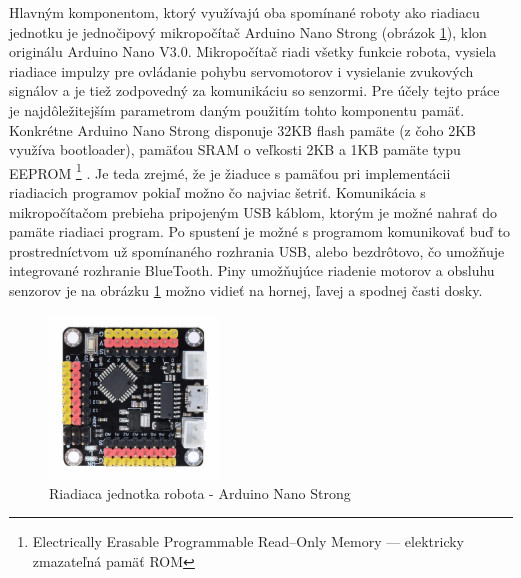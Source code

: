 Hlavným komponentom, ktorý využívajú oba spomínané roboty ako riadiacu jednotku je jednočipový mikropočítač Arduino Nano Strong (obrázok \ref{obr:arduino}), klon originálu Arduino Nano V3.0. Mikropočítač riadi všetky funkcie robota, vysiela riadiace impulzy pre ovládanie pohybu servomotorov i vysielanie zvukových signálov a je tiež zodpovedný za komunikáciu so senzormi. Pre účely tejto práce je najdôležitejším parametrom daným použitím tohto komponentu pamäť. Konkrétne Arduino Nano Strong disponuje 32KB flash pamäte (z čoho 2KB využíva bootloader), pamäťou SRAM o veľkosti 2KB a 1KB pamäte typu EEPROM \footnote{Electrically Erasable Programmable Read--Only Memory --- elektricky zmazateľná pamäť ROM} \cite{ArduinoNanoStrongSpecification}. Je teda zrejmé, že je žiaduce s pamäťou pri implementácii riadiacich programov pokiaľ možno čo najviac šetriť. Komunikácia s mikropočítačom prebieha pripojeným USB káblom, ktorým je možné nahrať do pamäte riadiaci program. Po spustení je možné s programom komunikovať buď to prostredníctvom už spomínaného rozhrania USB, alebo bezdrôtovo, čo umožňuje integrované rozhranie BlueTooth. Piny umožňujúce riadenie motorov a obsluhu senzorov je na obrázku \ref{obr:arduino} možno vidieť na hornej, ľavej a spodnej časti dosky.

\begin{figure}
\centerline{\includegraphics[width=0.4\textwidth]{images/arduino-nano-strong}}
\caption[Riadiaca jednotka - Arduino Nano Strong]{Riadiaca jednotka robota - Arduino Nano Strong}
\label{obr:arduino}
\end{figure}

